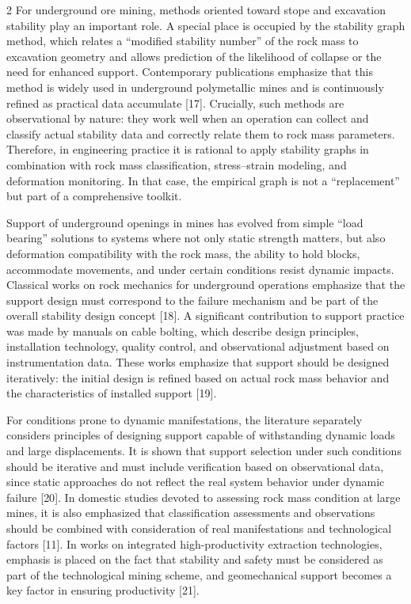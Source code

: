 \begin{multicols}{2}
For underground ore mining, methods oriented toward stope and excavation
stability play an important role. A special place is occupied by the
stability graph method, which relates a ``modified stability number'' of
the rock mass to excavation geometry and allows prediction of the
likelihood of collapse or the need for enhanced support. Contemporary
publications emphasize that this method is widely used in underground
polymetallic mines and is continuously refined as practical data
accumulate {[}17{]}. Crucially, such methods are observational by
nature: they work well when an operation can collect and classify actual
stability data and correctly relate them to rock mass parameters.
Therefore, in engineering practice it is rational to apply stability
graphs in combination with rock mass classification, stress--strain
modeling, and deformation monitoring. In that case, the empirical graph
is not a ``replacement'' but part of a comprehensive toolkit.

Support of underground openings in mines has evolved from simple ``load
bearing'' solutions to systems where not only static strength matters,
but also deformation compatibility with the rock mass, the ability to
hold blocks, accommodate movements, and under certain conditions resist
dynamic impacts. Classical works on rock mechanics for underground
operations emphasize that the support design must correspond to the
failure mechanism and be part of the overall stability design concept
{[}18{]}. A significant contribution to support practice was made by
manuals on cable bolting, which describe design principles, installation
technology, quality control, and observational adjustment based on
instrumentation data. These works emphasize that support should be
designed iteratively: the initial design is refined based on actual rock
mass behavior and the characteristics of installed support {[}19{]}.

For conditions prone to dynamic manifestations, the literature
separately considers principles of designing support capable of
withstanding dynamic loads and large displacements. It is shown that
support selection under such conditions should be iterative and must
include verification based on observational data, since static
approaches do not reflect the real system behavior under dynamic failure
{[}20{]}. In domestic studies devoted to assessing rock mass condition
at large mines, it is also emphasized that classification assessments
and observations should be combined with consideration of real
manifestations and technological factors {[}11{]}. In works on
integrated high-productivity extraction technologies, emphasis is placed
on the fact that stability and safety must be considered as part of the
technological mining scheme, and geomechanical support becomes a key
factor in ensuring productivity {[}21{]}.


\end{multicols}
